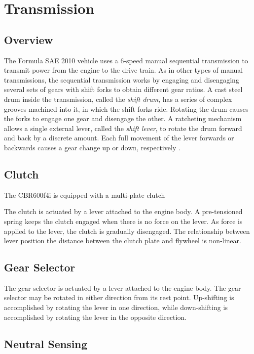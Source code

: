 \section{Transmission}

\subsection{Overview}

The Formula SAE 2010 vehicle uses a 6-speed manual sequential transmission to transmit power from the engine to the drive train. As in other types of manual transmissions, the sequential transmission works by engaging and disengaging several sets of gears with shift forks to obtain different gear ratios. A cast steel drum inside the transmission, called the \emph{shift drum}, has a series of complex grooves machined into it, in which the shift forks ride. Rotating the drum causes the forks to engage one gear and disengage the other. A ratcheting mechanism allows a single external lever, called the \emph{shift lever}, to rotate the drum forward and back by a discrete amount. Each full movement of the lever forwards or backwards causes a gear change up or down, respectively \cite{HowtoManualTransmission, cbr600}.

\subsection{Clutch}

The CBR600f4i is equipped with a multi-plate clutch \cite{clutch_control}

The clutch is actuated by a lever attached to the engine body. A pre-tensioned spring keeps the clutch engaged when there is no force on the lever. As force is applied to the lever, the clutch is gradually disengaged. The relationship between lever position the distance between the clutch plate and flywheel is non-linear. 

\subsection{Gear Selector}

The gear selector is actuated by a lever attached to the engine body. The gear selector may be rotated in either direction from its rest point. Up-shifting is accomplished by rotating the lever in one direction, while down-shifting is accomplished by rotating the lever in the opposite direction. 

\subsection{Neutral Sensing}

